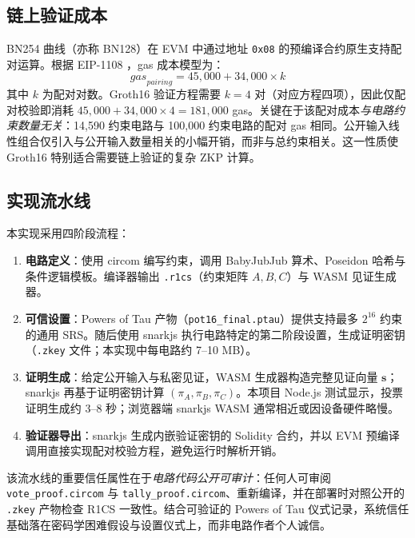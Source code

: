 \subsection{链上验证成本}

BN254 曲线（亦称 BN128）在 EVM 中通过地址 \texttt{0x08} 的预编译合约原生支持配对运算。根据 EIP-1108 \cite{eip1108}，gas 成本模型为：
\begin{equation}
    \mathit{gas}_{\mathit{pairing}} = 45{,}000 + 34{,}000 \times k
\end{equation}
其中 $k$ 为配对对数。Groth16 验证方程需要 $k = 4$ 对（对应方程四项），因此仅配对校验即消耗 $45{,}000 + 34{,}000 \times 4 = 181{,}000$ gas。关键在于该配对成本\emph{与电路约束数量无关}：14{,}590 约束电路与 100{,}000 约束电路的配对 gas 相同。公开输入线性组合仅引入与公开输入数量相关的小幅开销，而非与总约束相关。这一性质使 Groth16 特别适合需要链上验证的复杂 ZKP 计算。

\subsection{实现流水线}

本实现采用四阶段流程：
\begin{enumerate}
    \item \textbf{电路定义}：使用 circom 编写约束，调用 BabyJubJub 算术、Poseidon 哈希与条件逻辑模板。编译器输出 \texttt{.r1cs}（约束矩阵 $A,B,C$）与 WASM 见证生成器。
    \item \textbf{可信设置}：Powers of Tau 产物（\texttt{pot16\_final.ptau}）提供支持最多 $2^{16}$ 约束的通用 SRS。随后使用 snarkjs 执行电路特定的第二阶段设置，生成证明密钥（\texttt{.zkey} 文件；本实现中每电路约 7--10 MB）。
    \item \textbf{证明生成}：给定公开输入与私密见证，WASM 生成器构造完整见证向量 $\mathbf{s}$；snarkjs 再基于证明密钥计算 $(\pi_A, \pi_B, \pi_C)$。本项目 Node.js 测试显示，投票证明生成约 3--8 秒；浏览器端 snarkjs WASM 通常相近或因设备硬件略慢。
    \item \textbf{验证器导出}：snarkjs 生成内嵌验证密钥的 Solidity 合约，并以 EVM 预编译调用直接实现配对校验方程，避免运行时解析开销。
\end{enumerate}

该流水线的重要信任属性在于\emph{电路代码公开可审计}：任何人可审阅 \texttt{vote\_proof.circom} 与 \texttt{tally\_proof.circom}、重新编译，并在部署时对照公开的 \texttt{.zkey} 产物检查 R1CS 一致性。结合可验证的 Powers of Tau 仪式记录，系统信任基础落在密码学困难假设与设置仪式上，而非电路作者个人诚信。

